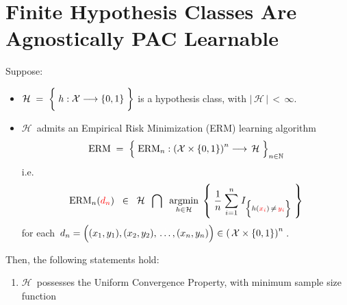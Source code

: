 

\section{Finite Hypothesis Classes Are Agnostically PAC Learnable}
\setcounter{theorem}{0}
\setcounter{equation}{0}


\renewcommand{\theenumi}{\roman{enumi}}
\renewcommand{\labelenumi}{\textnormal{(\theenumi)}$\;\;$}


\begin{theorem}
\mbox{}\vskip 0.1cm
\noindent
Suppose:
\begin{itemize}
\item
	$\mathcal{H} \; = \; \left\{\; h : \mathcal{X} \overset{{\color{white}\vert}}{\longrightarrow} \{0,1\}\;\right\}$
	is a hypothesis class, with $\vert\,\mathcal{H}\,\vert \,<\, \infty$.
\item
	$\mathcal{H}$\, admits an Empirical Risk Minimization (ERM) learning algorithm
	\begin{equation*}
	\textnormal{ERM} \;=\; \left\{\;
		\overset{{\color{white}.}}{\textnormal{ERM}_{n}} :
		\left(\mathcal{X}\times\{0,1\}\right)^{n} \longrightarrow \, \mathcal{H}
		\;\right\}_{n\in\N}
	\end{equation*}
	i.e.
	\begin{equation*}
	\textnormal{ERM}_{n}({\color{red}d_{n}})
	\;\; \in \;\;
		\mathcal{H}
		\;\; \bigcap \;\;
		\underset{h\in\mathcal{H}}{\argmin}\;\left\{\;
			\dfrac{1}{n}\;\overset{n}{\underset{i=1}{\sum}}\;
			I_{\left\{h({\color{red}x_{i}})\,\overset{{\color{white}.}}{\neq}\,{\color{red}y_{i}}\right\}}
			\;\right\}
	\end{equation*}
	for each
	\,$d_{n} = \left((x_{1},y_{1}),(x_{2},y_{2}),\,\overset{{\color{white}\vert}}{\ldots}\,,(x_{n},y_{n})\right)
	\in \left(\,\mathcal{X} \times \{0,1\} \right)^{n}$\,.
\end{itemize}
Then, the following statements hold:
\begin{enumerate}
\item
	$\mathcal{H}$\, possesses the Uniform Convergence Property,
	with minimum sample size function
	\begin{equation*}

\end{equation*}
\end{enumerate}
\end{theorem}
